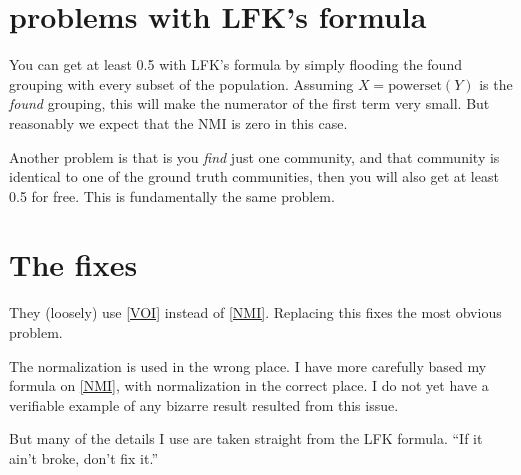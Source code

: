 \documentclass[9pt,technote]{IEEEtran}
\begin{document}
\section{problems with LFK's formula}
\label{sec:Flood}

You can get at least 0.5 with LFK's formula by simply flooding the found grouping with every subset of the population.
Assuming $X = \mbox{powerset}(Y)$ is the \emph{found} grouping, this will make the numerator of the first term
very small. But reasonably we expect that the NMI is zero in this case.

Another problem is that is you \emph{find} just one community, and that community is identical to one of the
ground truth communities, then you will also get at least 0.5 for free. This is fundamentally the same problem.

\section{The fixes}
They (loosely) use \cref{VOI} instead of \cref{NMI}. Replacing this fixes the most obvious problem.

The normalization is used in the wrong place.
I have more carefully based my formula on \cref{NMI}, with normalization in the correct place.
I do not yet have a verifiable example of any bizarre result resulted from this issue.

But many of the details I use are taken straight from the LFK formula. ``If it ain't broke, don't fix it.''
\end{document}
